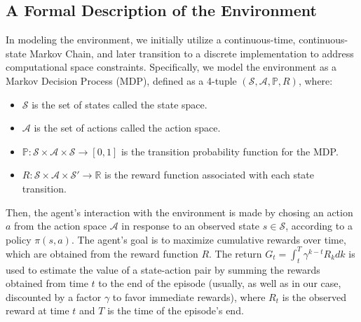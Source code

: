 \subsection{A Formal Description of the Environment}
\label{subsec:formal-description-of-the-rl-environment}
In modeling the environment, we initially utilize a continuous-time, continuous-state Markov Chain,
and later transition to a discrete implementation to address computational space constraints.
Specifically, we model the environment as a Markov Decision Process (MDP),
defined as a 4-tuple $ (\mathcal{S}, \mathcal{A}, \mathbb{P}, R) $, where:

\begin{itemize}
    \item $\mathcal{S}$ is the set of states called the state space.
    \item $\mathcal{A}$ is the set of actions called the action space.
    \item $\mathbb{P}: \mathcal{S} \times \mathcal{A} \times \mathcal{S} \to [0, 1]$ is the transition probability function for the MDP.
    \item $R: \mathcal{S} \times \mathcal{A} \times \mathcal{S}' \rightarrow \mathbb{R}$ is the reward function associated with each state transition.
\end{itemize}

Then, the agent's interaction with the environment is made by chosing an action $a$ from the action space $\mathcal{A}$ in response to an observed state $s \in \mathcal{S}$,
according to a policy $\pi (s, a)$.
The agent's goal is to maximize cumulative rewards over time, which are obtained from the reward function $R$.
The return $G_t = \int_{t}^{T} \gamma^{k-t} R_{k} dk$ is used to estimate the value of a state-action pair by summing the rewards obtained from time $t$ to the end of the episode
(usually, as well as in our case, discounted by a factor $\gamma$ to favor immediate rewards),
where $R_{t}$ is the observed reward at time $t$ and $T$ is the time of the episode's end.

